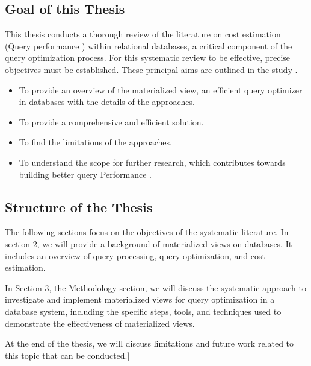 \subsection{Goal of this Thesis}
\normalsize
This thesis conducts a thorough review of the literature on cost estimation (Query performance ) within relational databases, a critical component of the query optimization process. For this systematic review to be effective, precise objectives must be established. These principal aims are outlined in the study \cite{CostEstimation}.
\begin{itemize}
  \item To provide an overview of the materialized view, an efficient query optimizer in databases with the details of the approaches.
  \item To provide a comprehensive and efficient solution.
  \item To find the limitations of the approaches.
  \item To understand the scope for further research, which contributes towards building
better query Performance \cite{CostEstimation}.
\end{itemize}
\subsection{Structure of the Thesis }
The following sections focus on the objectives of the systematic literature. In section 2, we will provide a background of materialized views on databases. It includes an overview of query processing, query optimization, and cost estimation.\vspace{.4cm}

In Section 3, the Methodology section, we will discuss the systematic approach to investigate and implement materialized views for query optimization in a database system, including the specific steps, tools, and techniques used to demonstrate the effectiveness of materialized views.\vspace{.4cm}

At the end of the thesis, we will discuss limitations and future work related to this topic that can be conducted.]










